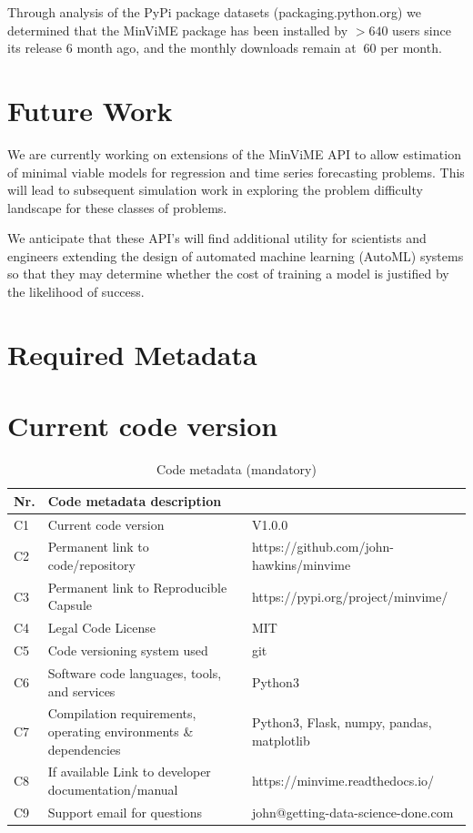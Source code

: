 \documentclass[preprint,12pt, a4paper]{elsarticle}
\begin{document}
Through analysis of the PyPi package datasets (packaging.python.org)
we determined that the MinViME package has been installed 
by $>640$ users since its release 6 month ago, and the monthly downloads 
remain at $~60$ per month.


\section{Future Work}

We are currently working on extensions of the MinViME API to allow estimation of 
minimal viable models for regression and time series forecasting problems. 
This will lead to subsequent simulation work in exploring the problem difficulty landscape
for these classes of problems. 

We anticipate that these API's will find additional
utility for scientists and engineers extending the design of automated machine learning
(AutoML) \cite{zoller2021} systems so that they may determine whether the cost 
of training a model is justified by the likelihood of success.






\section*{Required Metadata}
\label{}

\section*{Current code version}
\label{}

\begin{table}[!h]
\begin{tabular}{|l|p{6.5cm}|p{6.5cm}|}
\hline
\textbf{Nr.} & \textbf{Code metadata description} & \textbf{} \\
\hline
C1 & Current code version & V1.0.0 \\
\hline
C2 & Permanent link to code/repository & https://github.com/john-hawkins/minvime \\
\hline
C3  & Permanent link to Reproducible Capsule & https://pypi.org/project/minvime/ \\
\hline
C4 & Legal Code License   & MIT \\
\hline
C5 & Code versioning system used & git \\
\hline
C6 & Software code languages, tools, and services & Python3\\
\hline
C7 & Compilation requirements, operating environments \& dependencies & Python3, Flask, numpy, pandas, matplotlib\\
\hline
C8 & If available Link to developer documentation/manual & https://minvime.readthedocs.io/ \\
\hline
C9 & Support email for questions & john@getting-data-science-done.com \\
\hline
\end{tabular}
\caption{Code metadata (mandatory)}
\label{} 
\end{table}
\end{document}
